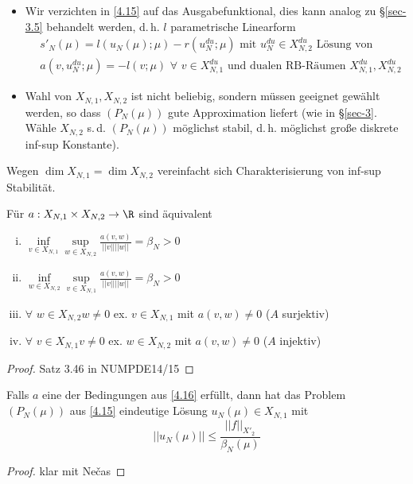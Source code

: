 \begin{bem} \beginwithlistbem
	\begin{itemize}
		\item Wir verzichten in \ref{4.15} auf das Ausgabefunktional, dies kann analog zu §\ref{sec-3.5} behandelt werden, d.\,h. $l$ parametrische Linearform
		\begin{align}
			&s'_N(\mu) = l(u_N(\mu);\mu) - r(u_N^{du};\mu) \text{ mit } u_N^{du} \in X_{N,2}^{du} \text{ Lösung von} \label{eq:4.5} \\
			&a(v, u_N^{du};\mu) = -l(v;\mu) \,\, \forall \,\, v \in X_{N,1}^{du} \text{ und dualen RB-Räumen } X_{N,1}^{du}, X_{N,2}^{du} \label{eq:4.6}
		\end{align}
		\item Wahl von $X_{N,1}, X_{N,2}$ ist nicht beliebig, sondern müssen geeignet gewählt werden, so dass $(P_N(\mu))$ gute Approximation liefert (wie in §\ref{sec-3}. Wähle $X_{N,2}$ s.\,d. $(P_N(\mu))$ möglichst stabil, d.\,h. möglichst große diskrete inf-sup Konstante).
	\end{itemize}
\end{bem}

Wegen $\dim X_{N,1} = \dim X_{N,2}$ vereinfacht sich Charakterisierung von inf-sup Stabilität.

\begin{satz} \label{4.16}
Für $a: X_{N,1} \times X_{N,2} \rightarrow \R$ sind äquivalent
\begin{enumerate}[i)]
	\item $\inf\limits_{v \in X_{N,1}} \sup\limits_{w \in X_{N,2}} \frac{a(v,w)}{||v|| ||w||} = \beta_N > 0$
	\item $\inf\limits_{w \in X_{N,2}} \sup\limits_{v \in X_{N,1}} \frac{a(v,w)}{||v|| ||w||} = \beta_N > 0$
	\item $\forall \,\, w \in X_{N,2} w \neq 0$ ex. $v \in X_{N,1}$ mit $a(v,w) \neq 0$ ($A$ surjektiv)
	\item $\forall \,\, v \in X_{N,1} v \neq 0$ ex. $w \in X_{N,2}$ mit $a(v,w) \neq 0$ ($A$ injektiv)
\end{enumerate}
\begin{proof}
Satz 3.46 in NUMPDE14/15
\end{proof}
\end{satz}

\begin{kor}
Falls $a$ eine der Bedingungen aus \ref{4.16} erfüllt, dann hat das Problem $(P_N(\mu))$ aus \ref{4.15} eindeutige Lösung $u_N(\mu) \in X_{N,1}$ mit
\[
	||u_N(\mu)|| \leq \frac{||f||_{X'_2}}{\beta_N(\mu)}
\]
\begin{proof}
klar mit Ne\v{c}as
\end{proof}
\end{kor}


